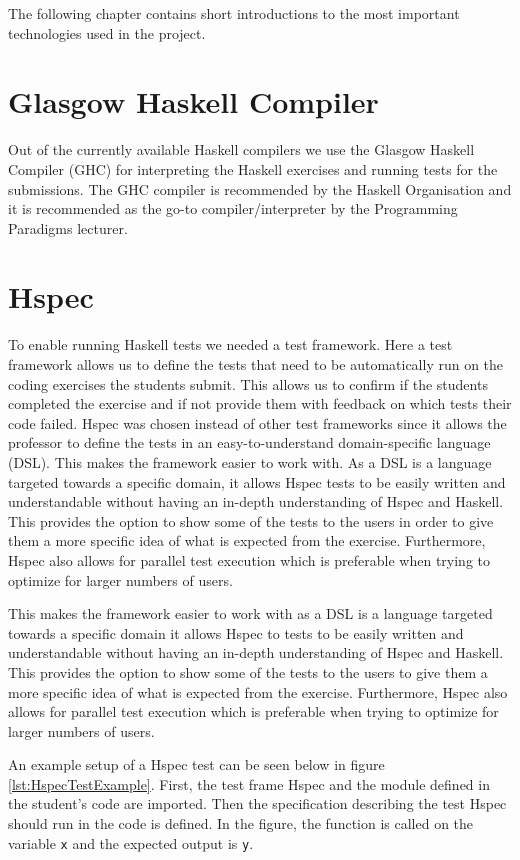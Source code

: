 The following chapter contains short introductions to the most important technologies used in the project.

\section*{Glasgow Haskell Compiler}
Out of the currently available Haskell compilers we use the Glasgow Haskell Compiler (GHC) for interpreting the Haskell exercises and running tests for the submissions. The GHC compiler is recommended by the Haskell Organisation and it is recommended as the go-to compiler/interpreter by the Programming Paradigms lecturer\cite{Haskell_GHC}.


\section*{Hspec}
To enable running Haskell tests we needed a test framework. Here a test framework allows us to define the tests that need to be automatically run on the coding exercises the students submit. This allows us to confirm if the students completed the exercise and if not provide them with feedback on which tests their code failed.
Hspec was chosen instead of other test frameworks since it allows the professor to define the tests in an easy-to-understand domain-specific language (DSL). 
This makes the framework easier to work with. As a DSL is a language targeted towards a specific domain, it allows Hspec tests to be easily written and understandable without having an in-depth understanding of Hspec and Haskell.
This provides the option to show some of the tests to the users in order to give them a more specific idea of what is expected from the exercise. 
Furthermore, Hspec also allows for parallel test execution which is preferable when trying to optimize for larger numbers of users\cite{Hspec_landing}.

This makes the framework easier to work with as a DSL is a language targeted towards a specific domain it allows Hspec to tests to be easily written and understandable without having an in-depth understanding of Hspec and Haskell. 
This provides the option to show some of the tests to the users to give them a more specific idea of what is expected from the exercise. 
Furthermore, Hspec also allows for parallel test execution which is preferable when trying to optimize for larger numbers of users.

An example setup of a Hspec test can be seen below in figure \ref{lst:HspecTestExample}. First, the test frame Hspec and the module defined in the student's code are imported. Then the specification describing the test Hspec should run in the code is defined. In the figure, the function is called on the variable \texttt{x} and the expected output is \texttt{y}.


